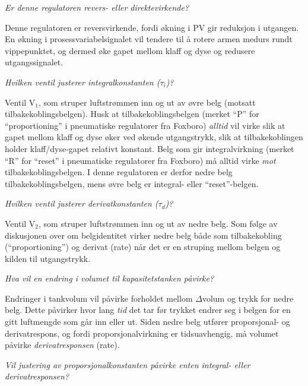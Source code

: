 





{\it Er denne regulatoren revers- eller direktevirkende?}

Denne regulatoren er reversvirkende, fordi økning i PV gir reduksjon i utgangen. En økning i prosessvariabelsignalet vil tendere til å rotere armen medurs rundt vippepunktet, og dermed øke gapet mellom klaff og dyse og redusere utgangssignalet.
 
\vskip 10pt

{\it Hvilken ventil justerer integralkonstanten ($\tau_i$)?}

Ventil V$_{1}$, som struper luftstrømmen inn og ut av øvre belg (motsatt tilbakekoblingsbelgen). Husk at tilbakekoblingsbelgen (merket ``P'' for ``proportioning'' i pneumatiske regulatorer fra Foxboro) {\it alltid} vil virke slik at gapet mellom klaff og dyse øker ved økende utgangstrykk, slik at tilbakekoblingen holder klaff/dyse-gapet relativt konstant. Belg som gir integralvirkning (merket ``R'' for ``reset'' i pneumatiske regulatorer fra Foxboro) må alltid virke {\it mot} tilbakekoblingsbelgen. I denne regulatoren er derfor nedre belg tilbakekoblingsbelgen, mens øvre belg er integral- eller ``reset''-belgen.
 
\vskip 10pt

{\it Hvilken ventil justerer derivatkonstanten ($\tau_d$)?}

Ventil V$_{2}$, som struper luftstrømmen inn og ut av nedre belg. Som følge av diskusjonen over om belgidentitet virker nedre belg både som tilbakekobling (``proportioning'') og derivat (rate) når det er en struping mellom belgen og kilden til utgangstrykk.
 
\vskip 10pt

{\it Hva vil en endring i volumet til kapasitetstanken påvirke?}

Endringer i tankvolum vil påvirke forholdet mellom $\Delta$volum og trykk for nedre belg. Dette påvirker hvor lang {\it tid} det tar før trykket endrer seg i belgen for en gitt luftmengde som går inn eller ut. Siden nedre belg utfører proporsjonal- og derivatrespons, og fordi proporsjonalvirkning er tidsuavhengig, må volumet påvirke {\it derivatresponsen} (rate).
 
\vskip 10pt

{\it Vil justering av proporsjonalkonstanten påvirke enten integral- eller derivatresponsen?}

